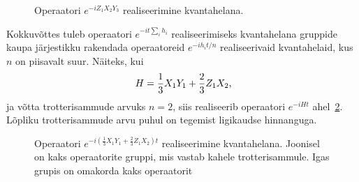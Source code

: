 \documentclass[12pt]{report}
\def\paren#1{\left(#1\right)}
\begin{document}
\begin{figure}[h]
  \centering
  \ifdefined\yquanton
  \fi
  \caption{Operaatori \(e^{-iZ_1X_2Y_3}\) realiseerimine kvantahelana.}
  \label{f:zxyex}
\end{figure}

Kokkuvõttes tuleb operaatori \(e^{-i t \sum_i h_i}\) realiseerimiseks kvantahelana gruppide kaupa järjestikku rakendada operaatoreid \(e^{-i h_i t/n}\) realiseerivaid kvantahelaid, kus \(n\) on piisavalt suur.
Näiteks, kui
\begin{align}\label{eq:hex}
    H=\frac{1}{3}X_1Y_1+\frac{2}{3}Z_1X_2 \rlap{,}
\end{align}
ja võtta trotterisammude arvuks \(n = 2\), siis realiseerib operaatori \(e^{-i Ht}\) ahel~\ref{fig:trot}.
Lõpliku trotterisammude arvu puhul on tegemist ligikaudse hinnanguga.

\begin{figure}
    \centering
    \ifdefined\yquanton
    \fi
    \caption{Operaatori \(e^{-i\paren{\frac{1}{3}X_1Y_1+\frac{2}{3}Z_1X_2} t}\) realiseerimine kvantahelana.
    Joonisel on kaks operaatorite gruppi, mis vastab kahele trotterisammule.
    Igas grupis on omakorda kaks operaatorit}
    \label{fig:trot}
\end{figure}
\end{document}
